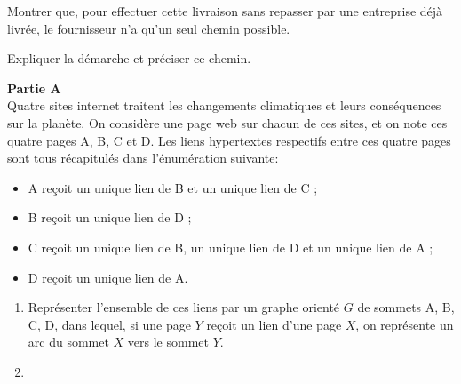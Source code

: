 \begin{exercice}
\begin{enumerate}
\begin{enumalph}
                  Montrer que, pour effectuer cette livraison sans repasser par une entreprise déjà livrée, le
                  fournisseur n'a qu'un seul chemin possible.
                  
                  Expliquer la démarche et préciser ce chemin.
              \end{enumalph}
    \end{enumerate}
\end{exercice}

\begin{exercice}
    \textbf{Partie A}\\
    \medskip
    Quatre sites internet traitent les changements climatiques et leurs conséquences sur la planète. On
    considère une page web sur chacun de ces sites, et on note ces quatre pages A, B, C et D. Les liens
    hypertextes respectifs entre ces quatre pages sont tous récapitulés dans l'énumération suivante:
    \begin{itemize}
        \item A reçoit un unique lien de B et un unique lien de C ;
        \item B reçoit un unique lien de D ;
        \item C reçoit un unique lien de B, un unique lien de D et un unique lien de A ;
        \item D reçoit un unique lien de A.
    \end{itemize}
    \begin{enumerate}
        \item Représenter l'ensemble de ces liens par un graphe orienté $G$ de sommets A, B, C, D, dans lequel,
              si une page $Y$ reçoit un lien d'une page $X$, on représente un arc du sommet $X$ vers le sommet $Y$.
        \item
\end{enumerate}
\end{exercice}
